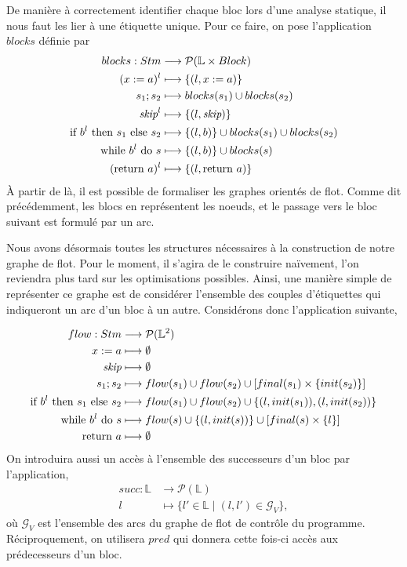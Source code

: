\documentclass[a4paper, 10pt]{article}
\begin{document}
De manière à correctement identifier chaque bloc lors d'une analyse statique, il nous faut les lier à une étiquette
unique. Pour ce faire, 
on pose l'application $blocks$ définie par
\begin{align*}
	blocks : Stm &\longrightarrow \mathcal{P}(\mathbb{L} \times Block)\\
	({x}\space:=\space{a})^l&\longmapsto\{(l, x := a)\}\\
	{s_1}\space;\space{s_2} &\longmapsto blocks(s_1) \cup blocks(s_2)\\
	\textit{skip}^l &\longmapsto \{(l, \textit{skip})\}\\
	\text{if }{b^l}\text{ then }{s_1}\text{ else }{s_2} &\longmapsto \{(l, b)\}\cup blocks(s_1)\cup blocks(s_2)\\
	\text{while }{b^l}\text{ do }{s} &\longmapsto \{(l, b)\}\cup blocks(s)\\
	(\text{return }{a})^l &\longmapsto \{(l, \text{return }{a})\}
\end{align*}
À partir de là, il est possible de formaliser les graphes orientés de flot. Comme dit précédemment, les blocs en représentent les noeuds, 
et le passage vers le bloc suivant est formulé par un arc.

Nous avons désormais toutes les structures nécessaires à la construction de notre graphe de flot. Pour le moment, il s'agira de 
le construire naïvement, l'on reviendra plus tard sur les optimisations possibles. Ainsi, une manière simple de représenter ce 
graphe est de considérer l'ensemble des couples d'étiquettes qui indiqueront un arc d'un bloc à un autre. 
Considérons donc l'application suivante, 

\begin{align*}
	flow : Stm &\longrightarrow \mathcal{P}(\mathbb{L}^2) \\
	{x}\space:=\space{a} &\longmapsto \emptyset \\
	\textit{skip} &\longmapsto \emptyset \\
	{s_1}\space;\space{s_2} &\longmapsto flow(s_1) \cup flow(s_2) \cup [final(s_1)\times\{init(s_2)\}] \\
	\text{if }{b^l}\text{ then }{s_1}\text{ else }{s_2} &\longmapsto flow(s_1)\cup flow(s_2)\cup\{(l, init(s_1)),(l, init(s_2))\} \\
	\text{while }{b^l}\text{ do }{s} &\longmapsto flow(s)\cup\{(l,init(s))\}\cup[final(s)\times\{l\}]\\
	\text{return }{a} &\longmapsto \emptyset
\end{align*}
On introduira aussi un accès à l'ensemble des successeurs d'un bloc par l'application,
\begin{align*}
	succ : \mathbb{L} &\longrightarrow \mathcal{P}(\mathbb{L})\\
	l &\longmapsto \{l' \in \mathbb{L} \mid (l, l') \in \mathcal{G}_V\},
\end{align*}
où $\mathcal{G}_V$ est l'ensemble des arcs du graphe de flot de contrôle du programme. Réciproquement, on 
utilisera $pred$ qui donnera cette fois-ci accès aux prédecesseurs d'un bloc.
\end{document}
